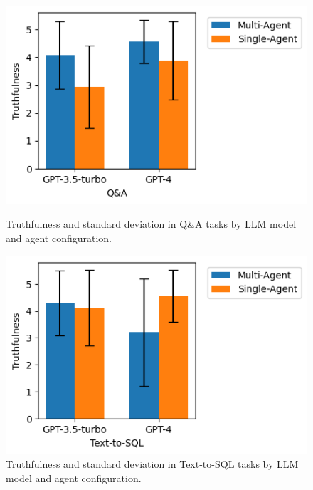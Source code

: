                 \begin{figure}[h]
                    \centering
                    \begin{minipage}{.48\textwidth}
                        \centering                
                        \includegraphics[width=1\linewidth]{images/truthfulness_QA.png}
                        \caption{Truthfulness and standard deviation in Q\&A tasks by LLM model and agent configuration.}
                        \label{fig:truthfulness_QA}
                    \end{minipage}%
                    \hspace{0.2cm}
                    \begin{minipage}{.48\textwidth}
                        \centering
                        \includegraphics[width=1\linewidth]{images/truthfulness_text2sql.png}
                        \caption{Truthfulness and standard deviation in Text-to-SQL tasks by LLM model and agent configuration.}
                        \label{fig:truthfulness_text2sql}
                    \end{minipage}
                \end{figure}

